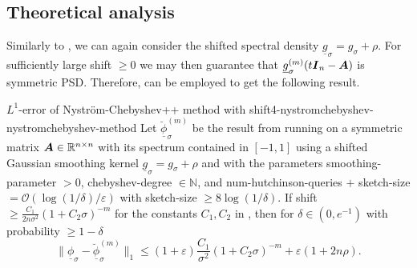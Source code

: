 
\subsection{Theoretical analysis}
\label{subsec:4-nystromchebyshev-analysis}


Similarly to , we can again consider
the shifted spectral density $\underline{g}_{\sigma} = g_{\sigma} + \rho$. For
sufficiently large \gls{shift} $\geq 0$ we may then guarantee that $\underline{g}_{\sigma}^{(m)}(t\boldsymbol{I}_n - \boldsymbol{A})$
is symmetric \gls{PSD}. Therefore,  can be
employed to get the following result.

\begin{theorem}{$L^1$-error of Nystr\"om-Chebyshev++ method with shift}{4-nystromchebyshev-nystromchebyshev-method}
    Let $\breve{\underline{\phi}}_{\sigma}^{(m)}$ be the result from running
     on a symmetric matrix
    $\boldsymbol{A} \in \mathbb{R}^{n \times n}$ with its spectrum contained in $[-1, 1]$
    using a shifted Gaussian smoothing kernel $\underline{g}_{\sigma} = g_{\sigma} + \rho$
    and with the parameters \gls{smoothing-parameter} $>0$, \gls{chebyshev-degree} $\in \mathbb{N}$, and
    \gls{num-hutchinson-queries} $+$ \gls{sketch-size} $=\mathcal{O}(\log(1/\delta)/\varepsilon)$
    with \gls{sketch-size} $\geq 8 \log(1/\delta)$.
    If \gls{shift} $\geq \frac{C_1}{2 n \sigma^2} (1 + C_2 \sigma)^{-m}$ for the constants
    $C_1, C_2$ in , then
    for $\delta \in (0, e^{-1})$ with probability $\geq 1-\delta$
    \begin{equation}
        \lVert \underline{\phi}_{\sigma} - \breve{\underline{\phi}}_{\sigma}^{(m)} \rVert _1
        \leq (1 + \varepsilon) \frac{C_1}{\sigma^2} (1 + C_2 \sigma)^{-m} + \varepsilon(1 + 2 n \rho).
    \end{equation}
\end{theorem}

